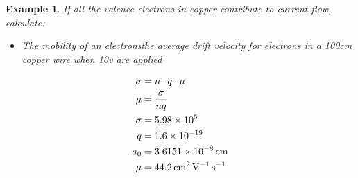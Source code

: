 \documentclass{article}
\newtheorem{theorem}{Example}
\begin{document}
\begin{theorem}
    If all the valence electrons in copper contribute to current flow, calculate:
    \begin{itemize}
        \item The mobility of an electronsthe average drift velocity for electrons in a 100cm copper wire when 10v are applied
    \end{itemize}
    \begin{equation*}
        \begin{aligned}
            \sigma & = n \cdot q \cdot \mu          \\
            \mu    & = \frac{\sigma}{nq}            \\
            \sigma & = \num{5.98E5}                 \\
            q      & = \num{1.6E-19}                \\
            a_0    & = \SI{3.6151E-8}{\centi\meter} \\
            \mu &= \SI{44.2}{\centi\meter\squared\per\volt\per\second}
        \end{aligned}
    \end{equation*}
\end{theorem}
\end{document}
